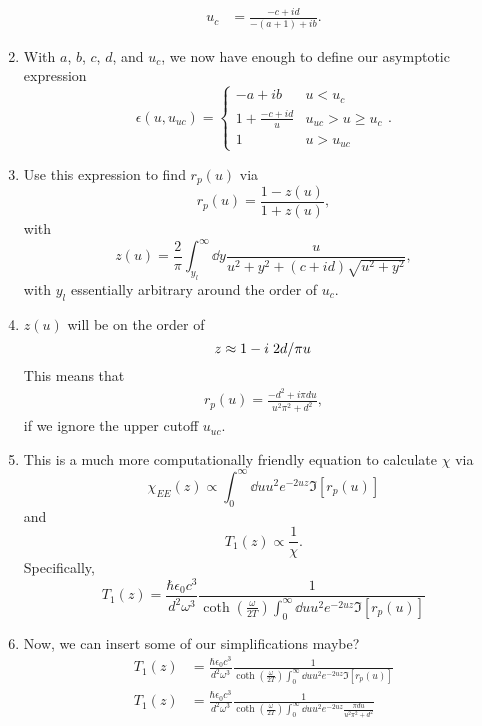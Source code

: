 \documentclass[../main.tex]{subfiles}
\begin{document}
\begin{enumerate}
\begin{align}
			u_c &= \frac{-c + id}{-(a + 1) + ib}.
		\end{align}
		\item With $a$, $b$, $c$, $d$, and $u_c$, we now have enough to define our asymptotic expression
		\begin{equation}
			\epsilon(u, u_{uc}) =
			\begin{cases}
				-a + i b & u < u_c \\
				1 + \frac{-c + i d}{u} &  u_{uc} > u \geq u_c \\
				1 & u > u_{uc}
			\end{cases}.
		\end{equation}
		\item Use this expression to find $r_p(u)$ via
		\begin{equation}
			r_p(u) = \frac{1 - z(u)}{1 + z(u)},
		\end{equation}
		with
		\begin{equation}
			z(u) = \frac{2}{\pi} \int_{y_l}^{\infty} \dd{y} \frac{u}{u^2 + y^2 + (c + i d)\sqrt{u^2 + y^2}},
		\end{equation}
		with $y_l$ essentially arbitrary around the order of $u_c$.
		\item $z(u)$ will be on the order of
		\begin{equation}
			z \approx 1 - i \flatfrac{2 d}{\pi u}
		\end{equation}
		This means that
		\begin{align}
			r_p(u) = \frac{-d^2 + i \pi d u}{u^2 \pi^2 + d^2},
		\end{align}
		if we ignore the upper cutoff $u_{uc}$.
		\item This is a much more computationally friendly equation to calculate $\chi$ via
		\begin{equation}
			\chi_{EE}(z) \propto \int_0^\infty \dd{u} u^2 e^{-2 u z} \Im[r_p(u)]
		\end{equation}
		and
		\begin{equation}
			T_1(z) \propto \frac{1}{\chi}.
		\end{equation}
		Specifically,
		\begin{equation}
			T_1(z) = \frac{\hbar \epsilon_0 c^{3}}{d^2 \omega^3} \frac{1}{\coth(\frac{\omega}{2 T}) \int_0^\infty \dd{u} u^2 e^{-2 u z} \Im[r_p(u)]}
		\end{equation}
		\item Now, we can insert some of our simplifications maybe?
		\begin{align}
			T_1(z) &= \frac{\hbar \epsilon_0 c^{3}}{d^2 \omega^3} \frac{1}{\coth(\frac{\omega}{2 T}) \int_0^\infty \dd{u} u^2 e^{-2 u z} \Im[r_p(u)]} \\
			T_1(z) &= \frac{\hbar \epsilon_0 c^{3}}{d^2 \omega^3} \frac{1}{\coth(\frac{\omega}{2 T}) \int_0^\infty \dd{u} u^2 e^{-2 u z} \frac{\pi d u}{u^2 \pi^2 + d^2}}
		\end{align}
	\end{enumerate}
\end{document}

